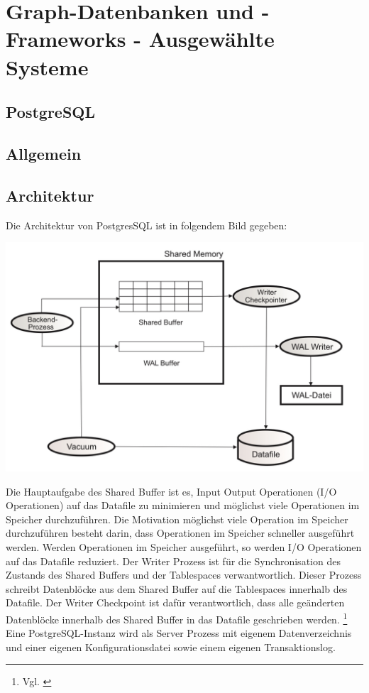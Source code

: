 \chapter{Graph-Datenbanken und -Frameworks - Ausgewählte Systeme }
\section{PostgreSQL}
\section{Allgemein}
\newpage
\section{Architektur}
Die Architektur von PostgresSQL ist in folgendem Bild gegeben:
\begin{center}
    \includegraphics[width = \linewidth]{./images/PostgresSQLArchitektur.jpg}
\end{center}
Die Hauptaufgabe des Shared Buffer ist es, Input Output Operationen (I/O Operationen) auf das Datafile zu minimieren und möglichst viele Operationen im Speicher durchzuführen. Die Motivation möglichst viele Operation im Speicher durchzuführen
besteht darin, dass Operationen im Speicher schneller ausgeführt werden. Werden Operationen im Speicher ausgeführt, so werden I/O Operationen auf das Datafile reduziert. Der Writer Prozess ist für die Synchronisation
des Zustands des Shared Buffers und der Tablespaces verwantwortlich. Dieser Prozess schreibt Datenblöcke aus dem Shared Buffer auf die Tablespaces innerhalb des Datafile. Der Writer Checkpoint ist dafür verantwortlich,
dass alle geänderten Datenblöcke innerhalb des Shared Buffer in das Datafile geschrieben werden. \footnote{Vgl. \cite[Seite 26]{froehlich01}} \\
Eine PostgreSQL-Instanz wird als Server Prozess mit eigenem Datenverzeichnis und einer eigenen Konfigurationsdatei sowie einem eigenen Transaktionslog.

